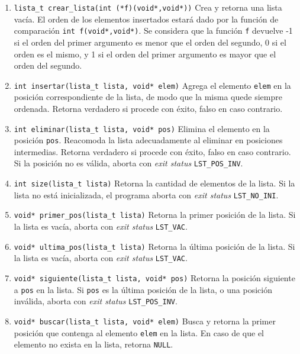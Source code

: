 \documentclass[12pt,a4paper]{article}
\begin{document}
\begin{enumerate}
	
	\item \texttt{lista\_t crear\_lista(int (*f)(void*,void*))} Crea y retorna una lista vacía. El orden de los elementos insertados estará dado por la función de comparación \texttt{int f(void*,void*)}. Se considera que la función \texttt{f} devuelve -1 si el orden del primer argumento es menor que el orden del segundo, 0 si el orden es el mismo, y 1 si el orden del primer argumento es mayor que el orden del segundo.
	
	\item \texttt{int insertar(lista\_t lista,  void* elem)} Agrega el elemento \texttt{elem} en la posición correspondiente de la lista, de modo que la misma quede siempre ordenada. Retorna verdadero si procede con éxito, falso en caso contrario.
	
	\item \texttt{int eliminar(lista\_t lista, void* pos)} Elimina el elemento en la posición \texttt{pos}. Reacomoda la lista adecuadamente al eliminar en posiciones intermedias. Retorna verdadero si procede con éxito, falso en caso contrario. Si la posición no es válida, aborta con \emph{exit status} \texttt{LST\_POS\_INV}.
	
	\item \texttt{int size(lista\_t lista)} Retorna la cantidad de elementos de la lista. Si la lista no está inicializada, el programa aborta con \emph{exit status} \texttt{LST\_NO\_INI}.
	
	\item \texttt{void* primer\_pos(lista\_t lista)} Retorna la primer posición de la lista. Si la lista es vacía, aborta con \emph{exit status} \texttt{LST\_VAC}.
	
	\item \texttt{void* ultima\_pos(lista\_t lista)} Retorna la última posición de la lista. Si la lista es vacía, aborta con \emph{exit status} \texttt{LST\_VAC}.

	\item \texttt{void* siguiente(lista\_t lista, void* pos)} Retorna la posición siguiente a \texttt{pos} en la lista. Si \texttt{pos} es la última posición de la lista, o una posición inválida, aborta con \emph{exit status} \texttt{LST\_POS\_INV}.
	
	\item \texttt{void* buscar(lista\_t lista, void* elem)} Busca y retorna la primer posición que contenga al elemento \texttt{elem} en la lista. En caso de que el elemento no exista en la lista, retorna \texttt{NULL}.
	

\end{enumerate}
\end{document}
